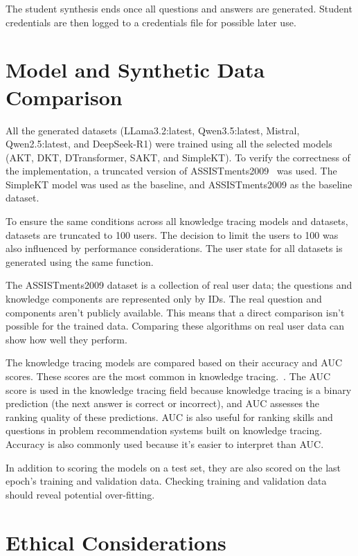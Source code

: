 The student synthesis ends once all questions and answers are generated. Student credentials are then logged to a credentials file for possible later use.

\section{Model and Synthetic Data Comparison}
All the generated datasets (LLama3.2:latest, Qwen3.5:latest, Mistral, Qwen2.5:latest, and DeepSeek-R1) were trained using all the selected models (AKT, DKT, DTransformer, SAKT, and SimpleKT). To verify the correctness of the implementation, a truncated version of ASSISTments2009~\autocite{assist2009} was used. The SimpleKT model was used as the baseline, and ASSISTments2009 as the baseline dataset.

To ensure the same conditions across all knowledge tracing models and datasets, datasets are truncated to 100 users. The decision to limit the users to 100 was also influenced by performance considerations. The user state for all datasets is generated using the same function.

The ASSISTments2009 dataset is a collection of real user data; the questions and knowledge components are represented only by IDs. The real question and components aren't publicly available. This means that a direct comparison isn't possible for the trained data. Comparing these algorithms on real user data can show how well they perform.

The knowledge tracing models are compared based on their accuracy and AUC scores. These scores are the most common in knowledge tracing.~\autocites{akt, dkt, pyktPaper}. The AUC score is used in the knowledge tracing field because knowledge tracing is a binary prediction (the next answer is correct or incorrect), and AUC assesses the ranking quality of these predictions. AUC is also useful for ranking skills and questions in problem recommendation systems built on knowledge tracing. Accuracy is also commonly used because it's easier to interpret than AUC\@.

In addition to scoring the models on a test set, they are also scored on the last epoch's training and validation data. Checking training and validation data should reveal potential over-fitting.

\section{Ethical Considerations}

